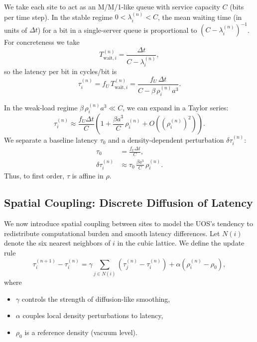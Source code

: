 We take each site to act as an M/M/1-like queue with service capacity $C$
(bits per time step). In the stable regime $0 < \lambda_i^{(n)} < C$, the mean
waiting time (in units of $\Delta t$) for a bit in a single-server queue is
proportional to $(C - \lambda_i^{(n)})^{-1}$. For concreteness we take
\begin{equation}
T_{\mathrm{wait},i}^{(n)} = \frac{\Delta t}{C - \lambda_i^{(n)}},
\end{equation}
so the latency per bit in cycles/bit is
\begin{equation}
\tau_i^{(n)} = f_U \, T_{\mathrm{wait},i}^{(n)} = \frac{f_U \, \Delta t}{C - \beta \, \rho_i^{(n)} a^3}.
\end{equation}

In the weak-load regime $\beta \, \rho_i^{(n)} a^3 \ll C$, we can expand in a
Taylor series:
\begin{equation}
\tau_i^{(n)} \approx \frac{f_U \Delta t}{C}\left(1 + \frac{\beta a^3}{C} \, \rho_i^{(n)} + O((\rho_i^{(n)})^2)\right).
\end{equation}
We separate a baseline latency $\tau_0$ and a density-dependent perturbation
$\delta \tau_i^{(n)}$:
\begin{align}
\tau_0 &= \frac{f_U \Delta t}{C}, \\
\delta \tau_i^{(n)} &\approx \tau_0 \, \frac{\beta a^3}{C} \, \rho_i^{(n)}.
\end{align}
Thus, to first order, $\tau$ is affine in $\rho$.

\subsection{Spatial Coupling: Discrete Diffusion of Latency}
We now introduce spatial coupling between sites to model the UOS's tendency to
redistribute computational burden and smooth latency differences. Let $N(i)$
denote the six nearest neighbors of $i$ in the cubic lattice. We define the
update rule
\begin{equation}
\tau_i^{(n+1)} - \tau_i^{(n)} = \gamma \sum_{j \in N(i)} \left(\tau_j^{(n)} - \tau_i^{(n)}\right)
  + \alpha \left(\rho_i^{(n)} - \rho_0\right),
\label{eq:discrete-update}
\end{equation}
where
\begin{itemize}
  \item $\gamma$ controls the strength of diffusion-like smoothing,
  \item $\alpha$ couples local density perturbations to latency,
  \item $\rho_0$ is a reference density (vacuum level).
\end{itemize}

